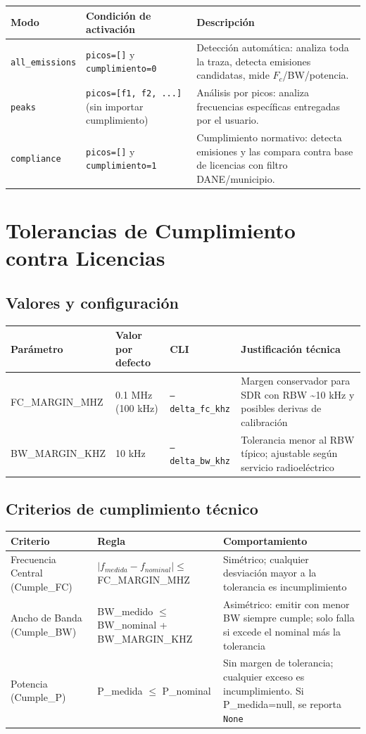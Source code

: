 \begin{tabular}{p{4cm}p{6cm}p{4cm}}
\textbf{Modo} & \textbf{Condición de activación} & \textbf{Descripción} \\
\hline
\texttt{all\_emissions} & \texttt{picos=[]} y \texttt{cumplimiento=0} & Detección automática: analiza toda la traza, detecta emisiones candidatas, mide $F_c$/BW/potencia. \\
\texttt{peaks} & \texttt{picos=[f1, f2, ...]} (sin importar cumplimiento) & Análisis por picos: analiza frecuencias específicas entregadas por el usuario. \\
\texttt{compliance} & \texttt{picos=[]} y \texttt{cumplimiento=1} & Cumplimiento normativo: detecta emisiones y las compara contra base de licencias con filtro DANE/municipio. \\
\end{tabular}

\section{Tolerancias de Cumplimiento contra Licencias}

\subsection{Valores y configuración}

\begin{tabular}{p{5cm}p{3cm}p{3cm}p{5cm}}
\textbf{Parámetro} & \textbf{Valor por defecto} & \textbf{CLI} & \textbf{Justificación técnica} \\
\hline
FC\_MARGIN\_MHZ & 0.1 MHz (100 kHz) & \texttt{--delta\_fc\_khz} & Margen conservador para SDR con RBW \textasciitilde10 kHz y posibles derivas de calibración \\
BW\_MARGIN\_KHZ & 10 kHz & \texttt{--delta\_bw\_khz} & Tolerancia menor al RBW típico; ajustable según servicio radioeléctrico \\
\end{tabular}

\subsection{Criterios de cumplimiento técnico}

\begin{tabular}{p{4cm}p{6cm}p{4cm}}
\textbf{Criterio} & \textbf{Regla} & \textbf{Comportamiento} \\
\hline
Frecuencia Central (Cumple\_FC) & $|f_{medida} - f_{nominal}| \leq$ FC\_MARGIN\_MHZ & Simétrico; cualquier desviación mayor a la tolerancia es incumplimiento \\
Ancho de Banda (Cumple\_BW) & BW\_medido $\leq$ BW\_nominal + BW\_MARGIN\_KHZ & Asimétrico: emitir con menor BW siempre cumple; solo falla si excede el nominal más la tolerancia \\
Potencia (Cumple\_P) & P\_medida $\leq$ P\_nominal & Sin margen de tolerancia; cualquier exceso es incumplimiento. Si P\_medida=null, se reporta \texttt{None} \\
\end{tabular}

